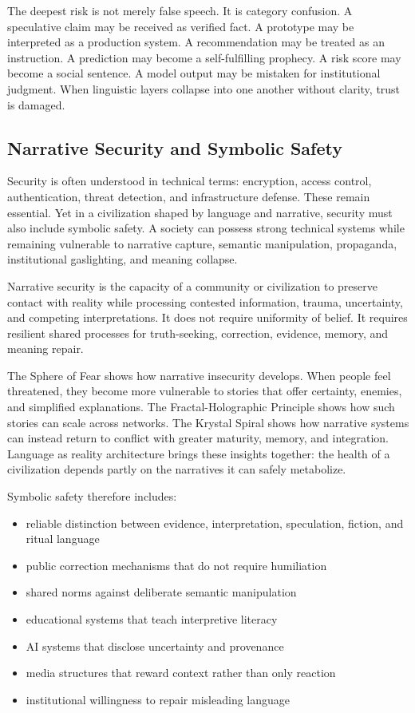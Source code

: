 \documentclass[12pt]{article}
\begin{document}
The deepest risk is not merely false speech. It is category confusion. A speculative claim may be received as verified fact. A prototype may be interpreted as a production system. A recommendation may be treated as an instruction. A prediction may become a self-fulfilling prophecy. A risk score may become a social sentence. A model output may be mistaken for institutional judgment. When linguistic layers collapse into one another without clarity, trust is damaged.

\subsection{Narrative Security and Symbolic Safety}

Security is often understood in technical terms: encryption, access control, authentication, threat detection, and infrastructure defense. These remain essential. Yet in a civilization shaped by language and narrative, security must also include symbolic safety. A society can possess strong technical systems while remaining vulnerable to narrative capture, semantic manipulation, propaganda, institutional gaslighting, and meaning collapse.

Narrative security is the capacity of a community or civilization to preserve contact with reality while processing contested information, trauma, uncertainty, and competing interpretations. It does not require uniformity of belief. It requires resilient shared processes for truth-seeking, correction, evidence, memory, and meaning repair.

The Sphere of Fear shows how narrative insecurity develops. When people feel threatened, they become more vulnerable to stories that offer certainty, enemies, and simplified explanations. The Fractal-Holographic Principle shows how such stories can scale across networks. The Krystal Spiral shows how narrative systems can instead return to conflict with greater maturity, memory, and integration. Language as reality architecture brings these insights together: the health of a civilization depends partly on the narratives it can safely metabolize.

Symbolic safety therefore includes:

\begin{itemize}
  \item reliable distinction between evidence, interpretation, speculation, fiction, and ritual language
  \item public correction mechanisms that do not require humiliation
  \item shared norms against deliberate semantic manipulation
  \item educational systems that teach interpretive literacy
  \item AI systems that disclose uncertainty and provenance
  \item media structures that reward context rather than only reaction
  \item institutional willingness to repair misleading language
\end{itemize}
\end{document}
